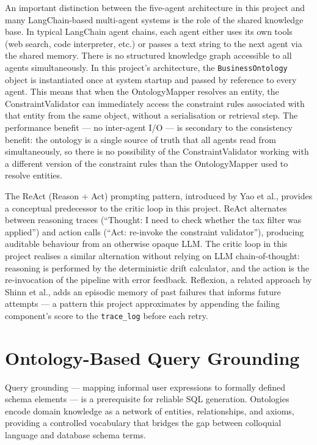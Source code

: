 \documentclass[12pt,a4paper]{report}
\begin{document}
An important distinction between the five-agent architecture in this project and many LangChain-based multi-agent systems is the role of the shared knowledge base. In typical LangChain agent chains, each agent either uses its own tools (web search, code interpreter, etc.) or passes a text string to the next agent via the shared memory. There is no structured knowledge graph accessible to all agents simultaneously. In this project's architecture, the \texttt{BusinessOntology} object is instantiated once at system startup and passed by reference to every agent. This means that when the OntologyMapper resolves an entity, the ConstraintValidator can immediately access the constraint rules associated with that entity from the same object, without a serialisation or retrieval step. The performance benefit — no inter-agent I/O — is secondary to the consistency benefit: the ontology is a single source of truth that all agents read from simultaneously, so there is no possibility of the ConstraintValidator working with a different version of the constraint rules than the OntologyMapper used to resolve entities.

The ReAct (Reason + Act) prompting pattern, introduced by Yao et al., provides a conceptual predecessor to the critic loop in this project. ReAct alternates between reasoning traces (``Thought: I need to check whether the tax filter was applied'') and action calls (``Act: re-invoke the constraint validator''), producing auditable behaviour from an otherwise opaque \ac{LLM}. The critic loop in this project realises a similar alternation without relying on \ac{LLM} chain-of-thought: reasoning is performed by the deterministic drift calculator, and the action is the re-invocation of the pipeline with error feedback. Reflexion, a related approach by Shinn et al., adds an episodic memory of past failures that informs future attempts — a pattern this project approximates by appending the failing component's score to the \texttt{trace\_log} before each retry.

\section{Ontology-Based Query Grounding}
\label{sec:ontology-grounding}

Query grounding — mapping informal user expressions to formally defined schema elements — is a prerequisite for reliable \ac{SQL} generation. Ontologies encode domain knowledge as a network of entities, relationships, and axioms, providing a controlled vocabulary that bridges the gap between colloquial language and database schema terms.
\end{document}
